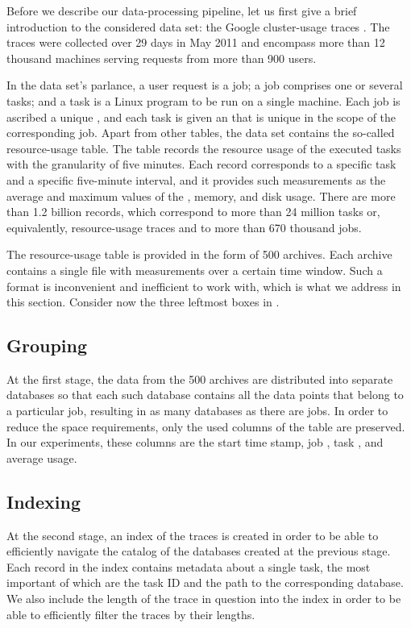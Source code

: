 Before we describe our data-processing pipeline, let us first give a brief
introduction to the considered data set: the Google cluster-usage traces
\cite{reiss2011}. The traces were collected over 29 days in May 2011 and
encompass more than 12 thousand machines serving requests from more than 900
users.

In the data set's parlance, a user request is a job; a job comprises one or
several tasks; and a task is a Linux program to be run on a single machine.
Each job is ascribed a unique , and each task is given an  that is
unique in the scope of the corresponding job. Apart from other tables, the data
set contains the so-called resource-usage table. The table records the resource
usage of the executed tasks with the granularity of five minutes. Each record
corresponds to a specific task and a specific five-minute interval, and it
provides such measurements as the average and maximum values of the ,
memory, and disk usage. There are more than 1.2 billion records, which
correspond to more than 24 million tasks or, equivalently, resource-usage traces
and to more than 670 thousand jobs.

The resource-usage table is provided in the form of 500 archives. Each archive
contains a single file with measurements over a certain time window. Such a
format is inconvenient and inefficient to work with, which is what we address in
this section. Consider now the three leftmost boxes in .

\subsection{Grouping} 
At the first stage, the data from the 500 archives are distributed into separate
databases so that each such database contains all the data points that belong to
a particular job, resulting in as many databases as there are jobs. In order to
reduce the space requirements, only the used columns of the table are preserved.
In our experiments, these columns are the start time stamp, job , task
, and average  usage.

\subsection{Indexing} 
At the second stage, an index of the traces is created in order to be able to
efficiently navigate the catalog of the databases created at the previous stage.
Each record in the index contains metadata about a single task, the most
important of which are the task ID and the path to the corresponding database.
We also include the length of the trace in question into the index in order to
be able to efficiently filter the traces by their lengths.

